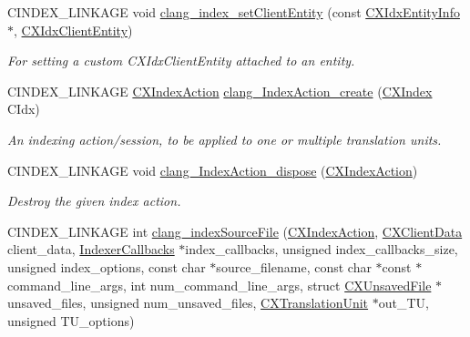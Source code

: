 \begin{DoxyCompactItemize}
\mbox{\label{group__CINDEX__HIGH_ga3b68cac914a9bf52ad54467cd5dbfbc7}} 
C\+I\+N\+D\+E\+X\+\_\+\+L\+I\+N\+K\+A\+GE void \mbox{\hyperlink{group__CINDEX__HIGH_ga3b68cac914a9bf52ad54467cd5dbfbc7}{clang\+\_\+index\+\_\+set\+Client\+Entity}} (const \mbox{\hyperlink{structCXIdxEntityInfo}{C\+X\+Idx\+Entity\+Info}} $\ast$, \mbox{\hyperlink{group__CINDEX__HIGH_gaaa7374e63b63b3d14af7cf87af386955}{C\+X\+Idx\+Client\+Entity}})
\begin{DoxyCompactList}\small\item\em For setting a custom C\+X\+Idx\+Client\+Entity attached to an entity. \end{DoxyCompactList}\item 
C\+I\+N\+D\+E\+X\+\_\+\+L\+I\+N\+K\+A\+GE \mbox{\hyperlink{group__CINDEX__HIGH_gac8d30d3e3fb34d887b611e7c6de3afb6}{C\+X\+Index\+Action}} \mbox{\hyperlink{group__CINDEX__HIGH_gaedee4ab7f093fedd27ed6995b1b7c62a}{clang\+\_\+\+Index\+Action\+\_\+create}} (\mbox{\hyperlink{group__CINDEX_gae039c2574bfd75774ca7a9a3e55910cb}{C\+X\+Index}} C\+Idx)
\begin{DoxyCompactList}\small\item\em An indexing action/session, to be applied to one or multiple translation units. \end{DoxyCompactList}\item 
C\+I\+N\+D\+E\+X\+\_\+\+L\+I\+N\+K\+A\+GE void \mbox{\hyperlink{group__CINDEX__HIGH_ga9b648aa6e87ea8d29dd0d4f0f592ffbb}{clang\+\_\+\+Index\+Action\+\_\+dispose}} (\mbox{\hyperlink{group__CINDEX__HIGH_gac8d30d3e3fb34d887b611e7c6de3afb6}{C\+X\+Index\+Action}})
\begin{DoxyCompactList}\small\item\em Destroy the given index action. \end{DoxyCompactList}\item 
C\+I\+N\+D\+E\+X\+\_\+\+L\+I\+N\+K\+A\+GE int \mbox{\hyperlink{group__CINDEX__HIGH_gaa5c2ad8979779c401b91110d444e2be6}{clang\+\_\+index\+Source\+File}} (\mbox{\hyperlink{group__CINDEX__HIGH_gac8d30d3e3fb34d887b611e7c6de3afb6}{C\+X\+Index\+Action}}, \mbox{\hyperlink{group__CINDEX_gacfa40c3de26d228c0d898403c2c21612}{C\+X\+Client\+Data}} client\+\_\+data, \mbox{\hyperlink{structIndexerCallbacks}{Indexer\+Callbacks}} $\ast$index\+\_\+callbacks, unsigned index\+\_\+callbacks\+\_\+size, unsigned index\+\_\+options, const char $\ast$source\+\_\+filename, const char $\ast$const $\ast$command\+\_\+line\+\_\+args, int num\+\_\+command\+\_\+line\+\_\+args, struct \mbox{\hyperlink{structCXUnsavedFile}{C\+X\+Unsaved\+File}} $\ast$unsaved\+\_\+files, unsigned num\+\_\+unsaved\+\_\+files, \mbox{\hyperlink{group__CINDEX_gacdb7815736ca709ce9a5e1ec2b7e16ac}{C\+X\+Translation\+Unit}} $\ast$out\+\_\+\+TU, unsigned T\+U\+\_\+options)

\end{DoxyCompactItemize}
